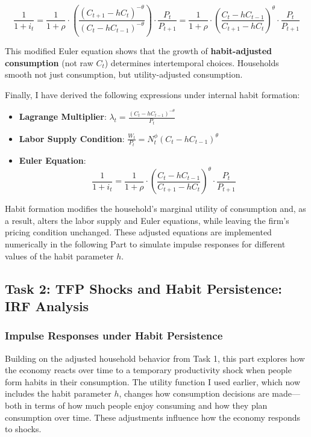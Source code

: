 \documentclass[12pt,a4paper,notitlepage]{article}
\numberwithin{equation}{section}
\begin{document}
\begin{itemize}
\begin{itemize}
\[
\frac{1}{1 + i_t} = \frac{1}{1 + \rho} \cdot 
\left( \frac{(C_{t+1} - h C_t)^{-\theta}}{(C_t - h C_{t-1})^{-\theta}} \right) \cdot \frac{P_t}{P_{t+1}} 
= \frac{1}{1 + \rho} \cdot 
\left( \frac{C_t - h C_{t-1}}{C_{t+1} - h C_t} \right)^{\theta} \cdot \frac{P_t}{P_{t+1}}
\]

This modified Euler equation shows that the growth of \textbf{habit-adjusted consumption} (not raw $C_t$) determines intertemporal choices. Households smooth not just consumption, but utility-adjusted consumption.


\vspace{2em}

Finally, I have derived the following expressions under internal habit formation:

\begin{itemize}
    \item \textbf{Lagrange Multiplier}:
    \(\lambda_t = \frac{(C_t - h C_{t-1})^{-\theta}}{P_t}\)
    \item \textbf{Labor Supply Condition}:
    \(\frac{W_t}{P_t} = N_t^\phi (C_t - h C_{t-1})^\theta\)
    \item \textbf{Euler Equation}:
    \[
    \frac{1}{1 + i_t} = \frac{1}{1 + \rho} \cdot 
    \left( \frac{C_t - h C_{t-1}}{C_{t+1} - h C_t} \right)^{\theta} \cdot \frac{P_t}{P_{t+1}}
    \]
\end{itemize}


\vspace{2em}

Habit formation modifies the household's marginal utility of consumption and, as a result, alters the labor supply and Euler equations, while leaving the firm’s pricing condition unchanged. These adjusted equations are implemented numerically in the following Part to simulate impulse responses for different values of the habit parameter $h$.


\newpage
\subsection{Task 2: TFP Shocks and Habit Persistence: IRF Analysis}
\subsubsection{   Impulse Responses under Habit Persistence}


Building on the adjusted household behavior from Task 1, this part explores how the economy reacts over time to a temporary productivity shock when people form habits in their consumption. The utility function I used earlier, which now includes the habit parameter \( h \), changes how consumption decisions are made—both in terms of how much people enjoy consuming and how they plan consumption over time. These adjustments influence how the economy responds to shocks.


\end{itemize}
\end{itemize}
\end{document}
